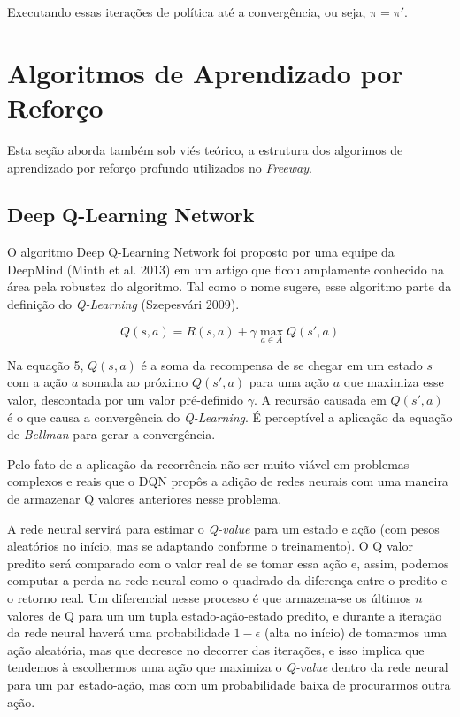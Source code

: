 \documentclass[letterpaper]{article} %
\begin{document}
Executando essas iterações de política até a convergência, ou seja, $\pi = \pi'$. 

\section{Algoritmos de Aprendizado por Reforço}
Esta seção aborda também sob viés teórico, a estrutura dos algorimos de aprendizado por reforço profundo utilizados no \textit{Freeway}.

\subsection{Deep Q-Learning Network}
O algoritmo Deep Q-Learning Network foi proposto por uma equipe da DeepMind (Minth et al. 2013) em um artigo que ficou amplamente conhecido na área pela robustez do algoritmo. Tal como o nome sugere, esse algoritmo parte da definição do \textit{Q-Learning} (Szepesvári 2009).

\begin{equation}
Q(s,a) = R(s,a) + \gamma \max_{a \in A} Q(s',a)
\end{equation}

Na equação 5, $Q(s,a)$ é a soma da recompensa de se chegar em um estado $s$ com a ação $a$ somada ao próximo $Q(s',a)$ para uma ação $a$ que maximiza esse valor, descontada por um valor pré-definido $\gamma$. A recursão causada em $Q(s',a)$ é o que causa a convergência do \textit{Q-Learning}. É perceptível a aplicação da equação de \textit{Bellman} para gerar a convergência.

Pelo fato de a aplicação da recorrência não ser muito viável em problemas complexos e reais que o DQN propôs a adição de redes neurais com uma maneira de armazenar Q valores anteriores nesse problema.

A rede neural servirá para estimar o \textit{Q-value} para um estado e ação (com pesos aleatórios no início, mas se adaptando conforme o treinamento). O Q valor predito será comparado com o valor real de se tomar essa ação e, assim, podemos computar a perda na rede neural como o quadrado da diferença entre o predito e o retorno real. Um diferencial nesse processo é que armazena-se os últimos $n$ valores de Q para um um tupla estado-ação-estado predito, e durante a iteração da rede neural haverá uma probabilidade $1-\epsilon$ (alta no início) de tomarmos uma ação aleatória, mas que decresce no decorrer das iterações, e isso implica que tendemos à escolhermos uma ação que maximiza o \textit{Q-value} dentro da rede neural para um par estado-ação, mas com um probabilidade baixa de procurarmos outra ação.
\end{document}

